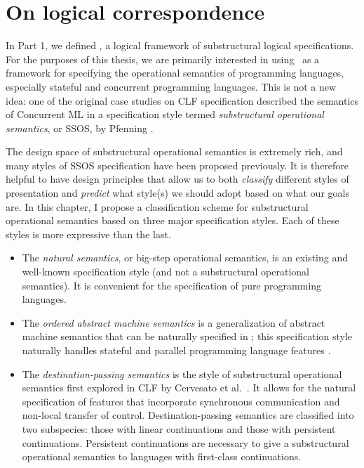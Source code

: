 \chapter{On logical correspondence}
\label{chapter-correspondence}

In Part 1, we defined \sls, a logical framework of substructural
logical specifications. For the purposes of this thesis, we are
primarily interested in using \sls~as a framework for specifying the
operational semantics of programming languages, especially stateful
and concurrent programming languages. This is not a new idea: one of
the original case studies on CLF specification described the semantics
of Concurrent ML \cite{cervesato02concurrent} in a specification style
termed {\it substructural operational semantics}, or SSOS, by Pfenning
\cite{pfenning04substructural}. 

The design space of substructural operational semantics is extremely
rich, and many styles of SSOS specification have been proposed
previously. It is therefore helpful to have design principles that
allow us to both {\it classify} different styles of presentation and
{\it predict} what style(s) we should adopt based on what our goals
are. In this chapter, I propose a classification scheme for
substructural operational semantics based on three major specification
styles.  Each of these styles is more expressive than the last.

\begin{itemize}
\item The {\it natural semantics}, or big-step operational semantics,
  is an existing and well-known specification style (and not a
  substructural operational semantics). It is convenient for the
  specification of pure programming languages.

\item The {\it ordered abstract machine semantics} is a generalization
  of abstract machine semantics that can be naturally specified in
  \sls; this specification style naturally handles stateful and
  parallel programming language features
  \cite{pfenning09substructural}.

\item The {\it destination-passing semantics} is the style of
  substructural operational semantics first explored in CLF by
  Cervesato et al.~\cite{cervesato02concurrent}. It allows for the
  natural specification of features that incorporate synchronous
  communication and non-local transfer of control. Destination-passing
  semantics are classified into two subspecies: those with linear
  continuations and those with persistent continuations. Persistent
  continuations are necessary to give a substructural operational
  semantics to languages with first-class continuations.
\end{itemize}


